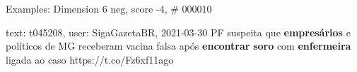 \begin{frame}{Examples: Dimension 6 neg, score -4, \# 000010}
\footnotesize
\begin{alertblock}{text: t045208, user: SigaGazetaBR, 2021-03-30}
PF suspeita que \textbf{empresários} e políticos de MG receberam vacina falsa 
após \textbf{encontrar} \textbf{soro} com \textbf{enfermeira} ligada ao caso 
https://t.co/Fz6xf11ago 
\end{alertblock}
\end{frame}
